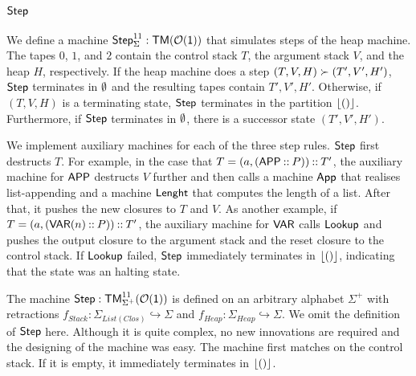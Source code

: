 \subsection{$\mathsf{Step}$}
\label{sec:heap-Step}
%


We define a machine $\mathsf{Step}_\Sigma^{11} : \mathsf{TM}(\mathcal{O}(\mathsf{1}))$ that simulates steps of the heap machine.  The tapes $0$, $1$, and $2$ contain the
control stack $T$, the argument stack $V$, and the heap $H$, respectively.  If the heap machine does a step $(T,V,H) \succ (T',V',H')$, $\mathsf{Step}$
terminates in $\emptyset$ and the resulting tapes contain $T',V',H'$.  Otherwise, if $(T,V,H)$ is a terminating state, $\mathsf{Step}$ terminates in the
partition $\left\lfloor {\ensuremath{\mathsf{()}}} \right\rfloor$.  Furthermore, if $\mathsf{Step}$ terminates in $\emptyset$, there is a successor state $(T',V',H')$.

We implement auxiliary machines for each of the three step rules.  $\mathsf{Step}$ first destructs $T$.  For example, in the case that
$T=(a, (\mathsf{APP} \mathbin{::} P)) \mathbin{::} T'$, the auxiliary machine for $\mathsf{APP}$ destructs $V$ further and then calls a machine $\mathsf{App}$ that realises
list-appending and a machine $\mathsf{Lenght}$ that computes the length of a list.  After that, it pushes the new closures to $T$ and $V$.  As another
example, if $T=(a, (\mathsf{VAR}(n) \mathbin{::} P)) \mathbin{::} T'$, the auxiliary machine for $\mathsf{VAR}$ calls $\mathsf{Lookup}$ and pushes the output closure to the
argument stack and the reset closure to the control stack.  If $\mathsf{Lookup}$ failed, $\mathsf{Step}$ immediately terminates in $\left\lfloor {\ensuremath{\mathsf{()}}} \right\rfloor$, indicating
that the state was an halting state.

The machine $\mathsf{Step} : \mathsf{TM}_{\Sigma^+}^{11}(\mathcal{O}(\mathsf{1}))$ is defined on an arbitrary alphabet $\Sigma^+$ with retractions
$f_{Stack} : \Sigma_{List(Clos)} \hookrightarrow \Sigma$ and $f_{Heap} : \Sigma_{Heap} \hookrightarrow \Sigma$.  We omit the definition of $\mathsf{Step}$
here.  Although it is quite complex, no new innovations are required and the designing of the machine was easy.  The machine first matches on the
control stack.  If it is empty, it immediately terminates in $\left\lfloor {\ensuremath{\mathsf{()}}} \right\rfloor$.

